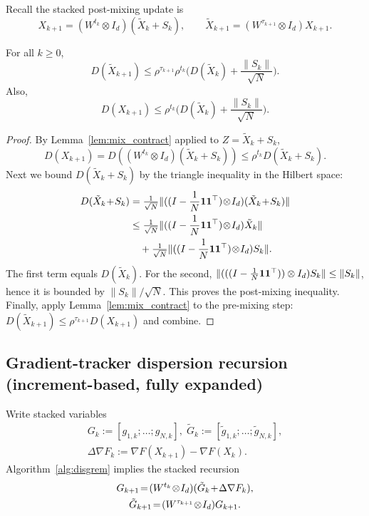 \documentclass[review,onefignum,onetabnum]{siamart171218}
\begin{document}
	Recall the stacked post-mixing update is
	\[
	X_{k+1}=(W^{t_k}\otimes I_d)(\tilde X_k+S_k),
	\qquad
	\tilde X_{k+1}=(W^{\tau_{k+1}}\otimes I_d)X_{k+1}.
	\]
	\begin{lemma}\label{lem:DX_rec}
		For all $k\ge0$,
		\[
		D(\tilde X_{k+1})
		\le \rho^{\tau_{k+1}}\rho^{t_k}\Big(D(\tilde X_k)+\frac{\|S_k\|}{\sqrt N}\Big).
		\]
		Also,
		\[
		D(X_{k+1})
		\le \rho^{t_k}\Big(D(\tilde X_k)+\frac{\|S_k\|}{\sqrt N}\Big).
		\]
	\end{lemma}
	\begin{proof}
		By Lemma~\ref{lem:mix_contract} applied to $Z=\tilde X_k+S_k$,
		\[
		D(X_{k+1})=D((W^{t_k}\otimes I_d)(\tilde X_k+S_k))\le \rho^{t_k}D(\tilde X_k+S_k).
		\]
		Next we bound $D(\tilde X_k+S_k)$ by the triangle inequality in the Hilbert space:
		\begin{align*}
			D(\tilde X_k\!+\!S_k)
			&=\tfrac1{\sqrt N}\|(\Pmat\!\otimes\! I_d)(\tilde X_k\!+\!S_k)\|\\
			&\le \tfrac1{\sqrt N}\|(\Pmat\!\otimes\! I_d)\tilde X_k\|\\
			&\quad+\tfrac1{\sqrt N}\|(\Pmat\!\otimes\! I_d)S_k\|.
		\end{align*}
		The first term equals $D(\tilde X_k)$.
		For the second, $\|(((I-\frac{1}{N}\mathbf{1}\mathbf{1}^\top))\otimes I_d)S_k\|\le \|S_k\|$, hence it is bounded by $\|S_k\|/\sqrt N$.
		This proves the post-mixing inequality.
		Finally, apply Lemma~\ref{lem:mix_contract} to the pre-mixing step:
		$D(\tilde X_{k+1})\le \rho^{\tau_{k+1}}D(X_{k+1})$ and combine.
	\end{proof}
	
	\subsection{Gradient-tracker dispersion recursion (increment-based, fully expanded)}
	
	Write stacked variables
	\begin{gather*}
		G_k:=[g_{1,k};\dots;g_{N,k}],\;
		\tilde G_k:=[\tilde g_{1,k};\dots;\tilde g_{N,k}],\\
		\Delta\nabla F_k:=\nabla F(X_{k+1})-\nabla F(X_k).
	\end{gather*}
	Algorithm~\ref{alg:disgrem} implies the stacked recursion
	\begin{gather}
		G_{k+1}\!=\!(W^{t_k}\!\otimes\! I_d)(\tilde G_k\!+\!\Delta\nabla F_k),\label{eq:G_update_stack}\\
		\tilde G_{k+1}\!=\!(W^{\tau_{k+1}}\!\otimes\! I_d)G_{k+1}.\notag
	\end{gather}
	
\end{document}
